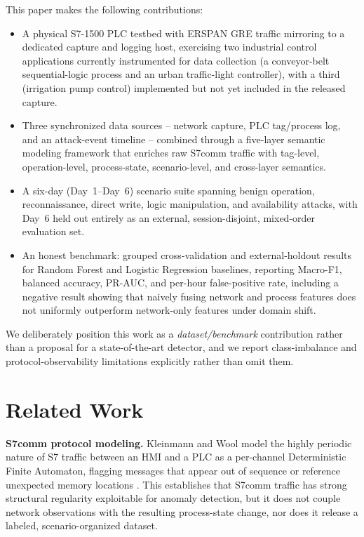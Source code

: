 \documentclass[conference]{IEEEtran}
\begin{document}
This paper makes the following contributions:
\begin{itemize}
\item A physical S7-1500 PLC testbed with ERSPAN GRE traffic mirroring to a dedicated capture and logging host, exercising two industrial control applications currently instrumented for data collection (a conveyor-belt sequential-logic process and an urban traffic-light controller), with a third (irrigation pump control) implemented but not yet included in the released capture.
\item Three synchronized data sources -- network capture, PLC tag/process log, and an attack-event timeline -- combined through a five-layer semantic modeling framework that enriches raw S7comm traffic with tag-level, operation-level, process-state, scenario-level, and cross-layer semantics.
\item A six-day (Day~1--Day~6) scenario suite spanning benign operation, reconnaissance, direct write, logic manipulation, and availability attacks, with Day~6 held out entirely as an external, session-disjoint, mixed-order evaluation set.
\item An honest benchmark: grouped cross-validation and external-holdout results for Random Forest and Logistic Regression baselines, reporting Macro-F1, balanced accuracy, PR-AUC, and per-hour false-positive rate, including a negative result showing that naively fusing network and process features does not uniformly outperform network-only features under domain shift.
\end{itemize}

We deliberately position this work as a \emph{dataset/benchmark} contribution rather than a proposal for a state-of-the-art detector, and we report class-imbalance and protocol-observability limitations explicitly rather than omit them.

\section{Related Work}

\textbf{S7comm protocol modeling.} Kleinmann and Wool model the highly periodic nature of S7 traffic between an HMI and a PLC as a per-channel Deterministic Finite Automaton, flagging messages that appear out of sequence or reference unexpected memory locations \cite{kleinmann2014}. This establishes that S7comm traffic has strong structural regularity exploitable for anomaly detection, but it does not couple network observations with the resulting process-state change, nor does it release a labeled, scenario-organized dataset.
\end{document}

